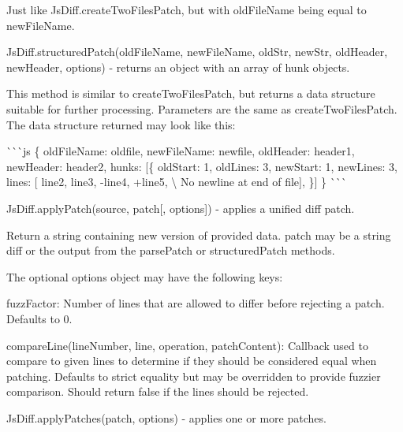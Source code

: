\begin{DoxyItemize}
Just like Js\+Diff.\+create\+Two\+Files\+Patch, but with old\+File\+Name being equal to new\+File\+Name.
\item {\ttfamily Js\+Diff.\+structured\+Patch(old\+File\+Name, new\+File\+Name, old\+Str, new\+Str, old\+Header, new\+Header, options)} -\/ returns an object with an array of hunk objects.

This method is similar to create\+Two\+Files\+Patch, but returns a data structure suitable for further processing. Parameters are the same as create\+Two\+Files\+Patch. The data structure returned may look like this\+:

\`{}\`{}\`{}js \{ old\+File\+Name\+: \textquotesingle{}oldfile\textquotesingle{}, new\+File\+Name\+: \textquotesingle{}newfile\textquotesingle{}, old\+Header\+: \textquotesingle{}header1\textquotesingle{}, new\+Header\+: \textquotesingle{}header2\textquotesingle{}, hunks\+: \mbox{[}\{ old\+Start\+: 1, old\+Lines\+: 3, new\+Start\+: 1, new\+Lines\+: 3, lines\+: \mbox{[}\textquotesingle{} line2\textquotesingle{}, \textquotesingle{} line3\textquotesingle{}, \textquotesingle{}-\/line4\textquotesingle{}, \textquotesingle{}+line5\textquotesingle{}, \textquotesingle{}\textbackslash{} No newline at end of file\textquotesingle{}\mbox{]}, \}\mbox{]} \} \`{}\`{}\`{}
\item {\ttfamily Js\+Diff.\+apply\+Patch(source, patch\mbox{[}, options\mbox{]})} -\/ applies a unified diff patch.

Return a string containing new version of provided data. {\ttfamily patch} may be a string diff or the output from the {\ttfamily parse\+Patch} or {\ttfamily structured\+Patch} methods.

The optional {\ttfamily options} object may have the following keys\+:
\begin{DoxyItemize}
\item {\ttfamily fuzz\+Factor}\+: Number of lines that are allowed to differ before rejecting a patch. Defaults to 0.
\item {\ttfamily compare\+Line(line\+Number, line, operation, patch\+Content)}\+: Callback used to compare to given lines to determine if they should be considered equal when patching. Defaults to strict equality but may be overridden to provide fuzzier comparison. Should return false if the lines should be rejected.
\end{DoxyItemize}
\item {\ttfamily Js\+Diff.\+apply\+Patches(patch, options)} -\/ applies one or more patches.


\end{DoxyItemize}

